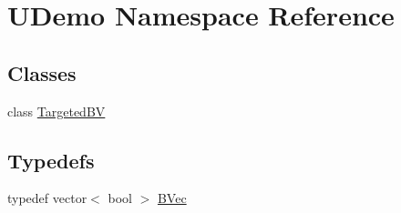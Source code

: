 \hypertarget{namespace_u_demo}{\section{U\-Demo Namespace Reference}
\label{namespace_u_demo}
}
\subsection*{Classes}
\begin{DoxyCompactItemize}
\item 
class \hyperlink{class_u_demo_1_1_targeted_b_v}{Targeted\-B\-V}
\end{DoxyCompactItemize}
\subsection*{Typedefs}
\begin{DoxyCompactItemize}
\item 
typedef vector$<$ bool $>$ \hyperlink{namespace_u_demo_a18a17f7d582322b46be0f2a8add9fb4e}{B\-Vec}
\end{DoxyCompactItemize}
